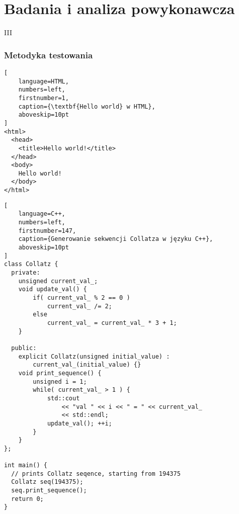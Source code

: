 \part{Badania i analiza powykonawcza}{III}
\noindent \lipsum[1-5]

\clearpage\section{Metodyka testowania}
\noindent \lipsum[6-8]

\begin{addmargin}[8mm]{0mm}
\begin{lstlisting}[
    language=HTML,
    numbers=left,
    firstnumber=1,
    caption={\textbf{Hello world} w HTML},
    aboveskip=10pt
]
<html>
  <head>
    <title>Hello world!</title>
  </head>
  <body>
    Hello world!
  </body>
</html>
\end{lstlisting}
\end{addmargin}

\lipsum[9-10]

\begin{addmargin}[12mm]{0mm}
\begin{lstlisting}[
    language=C++,
    numbers=left,
    firstnumber=147,
    caption={Generowanie sekwencji Collatza w języku C++},
    aboveskip=10pt
]
class Collatz {
  private:
    unsigned current_val_;
    void update_val() {
        if( current_val_ % 2 == 0 )
            current_val_ /= 2;
        else
            current_val_ = current_val_ * 3 + 1;
    }

  public:
    explicit Collatz(unsigned initial_value) :
        current_val_(initial_value) {}
    void print_sequence() {
        unsigned i = 1;
        while( current_val_ > 1 ) {
            std::cout
                << "val " << i << " = " << current_val_
                << std::endl;
            update_val(); ++i;
        }
    }
};

int main() {
  // prints Collatz seqence, starting from 194375
  Collatz seq(194375);
  seq.print_sequence();
  return 0;
}
\end{lstlisting}
\end{addmargin}

\lipsum[10-12]
 
